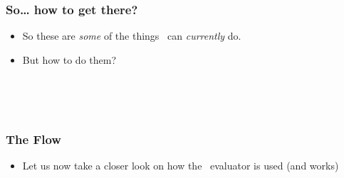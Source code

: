 %
%
\begin{frame}%
\frametitle{So{\dots} how to get there?}%
\begin{itemize}%
\item So these are \emph{some} of the things \optimizationBenchmarking\ can \emph{currently} do.%
\item<2-> But how to do them?\\\strut\\\strut\\\strut%
\end{itemize}%
%
\end{frame}%
%
\begin{frame}%
\frametitle{The Flow}%
\begin{itemize}%
\item Let us now take a closer look on how the \optimizationBenchmarking\ evaluator is used (and works)%
\end{itemize}%
\end{frame}%
%
